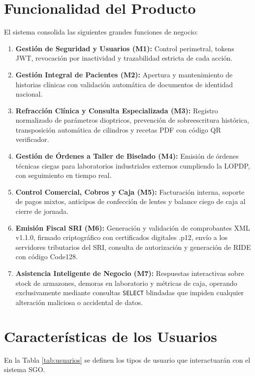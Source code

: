 \documentclass[12pt,a4paper]{report}
\begin{document}
\section{Funcionalidad del Producto}
El sistema consolida las siguientes grandes funciones de negocio:
\begin{enumerate}
    \item \textbf{Gestión de Seguridad y Usuarios (M1):} Control perimetral, tokens JWT, revocación por inactividad y trazabilidad estricta de cada acción.
    \item \textbf{Gestión Integral de Pacientes (M2):} Apertura y mantenimiento de historias clínicas con validación automática de documentos de identidad nacional.
    \item \textbf{Refracción Clínica y Consulta Especializada (M3):} Registro normalizado de parámetros dioptricos, prevención de sobreescritura histórica, transposición automática de cilindros y recetas PDF con código QR verificador.
    \item \textbf{Gestión de Órdenes a Taller de Biselado (M4):} Emisión de órdenes técnicas ciegas para laboratorios industriales externos cumpliendo la LOPDP, con seguimiento en tiempo real.
    \item \textbf{Control Comercial, Cobros y Caja (M5):} Facturación interna, soporte de pagos mixtos, anticipos de confección de lentes y balance ciego de caja al cierre de jornada.
    \item \textbf{Emisión Fiscal SRI (M6):} Generación y validación de comprobantes XML v1.1.0, firmado criptográfico con certificados digitales .p12, envío a los servidores tributarios del SRI, consulta de autorización y generación de RIDE con código Code128.
    \item \textbf{Asistencia Inteligente de Negocio (M7):} Respuestas interactivas sobre stock de armazones, demoras en laboratorio y métricas de caja, operando exclusivamente mediante consultas \texttt{SELECT} blindadas que impiden cualquier alteración maliciosa o accidental de datos.
\end{enumerate}

\section{Características de los Usuarios}
En la Tabla \ref{tab:usuarios} se definen los tipos de usuario que interactuarán con el sistema SGO.
\end{document}
